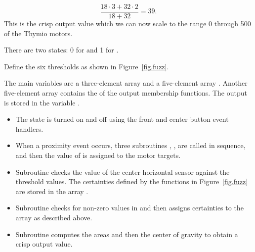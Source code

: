 \begin{displaymath}
\frac{18\cdot 3 + 32\cdot 2}{18+32}=39.
\end{displaymath}
This is the crisp output value which we can now scale to the range 0
through 500 of the Thymio motors.


There are two states: 0 for  and 1 for .


Define the six thresholds as shown in Figure~\ref{fig.fuzz}.


The main variables are a three-element array  and a
five-element array . Another five-element array contains
the  of the output membership functions. The output is stored
in the variable .


\begin{itemize}

\item The state is turned on and off using the front and center button event handlers.

\item When a proximity event occurs, three subroutines ,
,  are called in sequence, and then the
value of  is assigned to the motor targets.

\item Subroutine  checks the value of the center horizontal
sensor against the threshold values. The certainties defined by the
functions in Figure~\ref{fig.fuzz} are stored in the array .

\item Subroutine  checks for non-zero values in
 and then assigns certainties to the array 
as described above.

\item Subroutine  computes the areas and then the
center of gravity to obtain a crisp output value.

\end{itemize}



